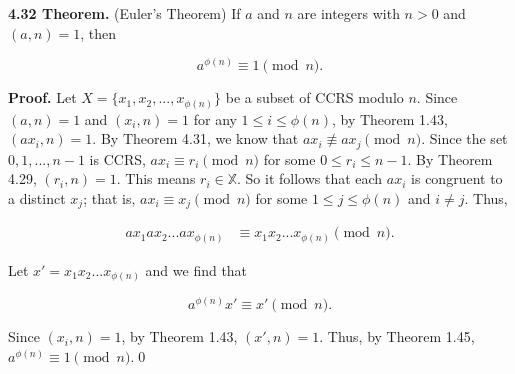 \documentclass[12pt]{article}
\begin{document}
\noindent\textbf{4.32 Theorem.} (Euler's Theorem) If $a$ and $n$ are integers with $n>0$ and $(a,n)=1$, then

\begin{equation*}
a^{\phi(n)}\equiv 1\pmod n.
\end{equation*}

\bigskip

\noindent\textbf{Proof.} Let $X=\{x_1,x_2,...,x_{\phi(n)}\}$ be a subset of CCRS modulo $n$. Since $(a,n)=1$ and $(x_i,n)=1$ for any $1\leq i \leq \phi(n)$, by Theorem 1.43, $(ax_i,n)=1$. By Theorem 4.31, we know that $ax_i\not\equiv ax_j\pmod n$. Since the set $0,1,...,n-1$ is CCRS, $ax_i\equiv r_i \pmod n$ for some $0\leq r_i\leq n-1$. By Theorem 4.29, $(r_i,n)=1$. This means $r_i\in\mathbb{X}$. So it follows that each $ax_i$ is congruent to a distinct $x_j$; that is, $ax_i \equiv x_j\pmod n$ for some $1\leq j \leq \phi(n)$ and $i\not= j$. Thus,

\begin{align*}
ax_1ax_2...ax_{\phi(n)} &\equiv x_1x_2...x_{\phi(n)}\pmod n.
\end{align*} 

\noindent Let $x'= x_1x_2...x_{\phi(n)}$ and we find that

\begin{equation*}
a^{\phi(n)}x' \equiv x' \pmod n.
\end{equation*}

\noindent Since $(x_i,n)=1$, by Theorem 1.43, $(x',n)=1$. Thus, by Theorem 1.45, $a^{\phi(n)}\equiv 1\pmod n$.\qed
\end{document}
